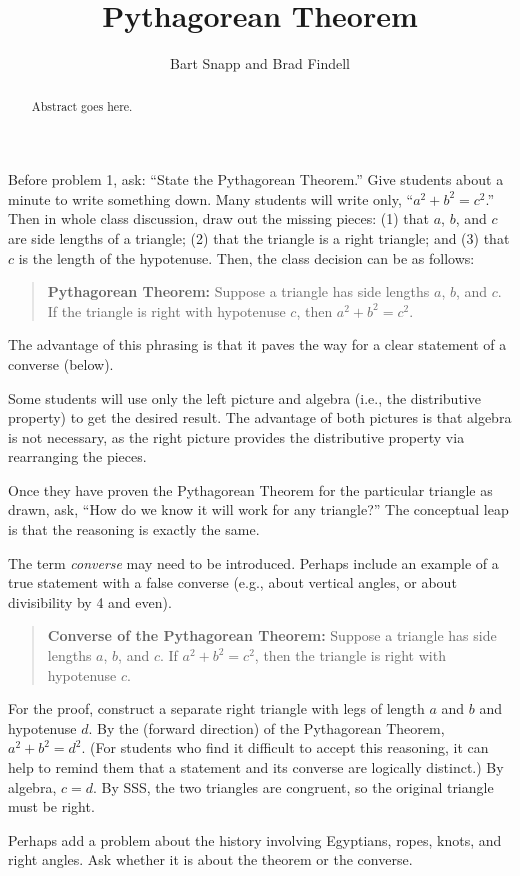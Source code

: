 \documentclass{ximera}
\title{Pythagorean Theorem}
\author{Bart Snapp and Brad Findell}
\begin{document}
\begin{abstract}
Abstract goes here.  
\end{abstract}
\maketitle

\begin{teachingnote}
Before problem 1, ask:  ``State the Pythagorean Theorem.''  Give students about a minute to write something down.  Many students will write only, ``$a^2 + b^2 = c^2$.''  Then in whole class discussion, draw out the missing pieces:  (1) that $a$, $b$, and $c$ are side lengths of a triangle;  (2) that the triangle is a right triangle; and (3) that $c$ is the length of the hypotenuse.  Then, the class decision can be as follows: 
 
\begin{quote}\textbf{Pythagorean Theorem:}  Suppose a triangle has side lengths $a$, $b$, and $c$.  If the triangle is right with hypotenuse $c$, then $a^2 + b^2 = c^2$. 
\end{quote}
The advantage of this phrasing is that it paves the way for a clear statement of a converse (below).   

Some students will use only the left picture and algebra (i.e., the distributive property) to get the desired result.  The advantage of both pictures is that algebra is not necessary, as the right picture provides the distributive property via rearranging the pieces.  

Once they have proven the Pythagorean Theorem for the particular triangle as drawn, ask, ``How do we know it will work for any triangle?''  The conceptual leap is that the reasoning is exactly the same.  

The term \emph{converse} may need to be introduced.  Perhaps include an example of a true statement with a false converse (e.g., about vertical angles, or about divisibility by 4 and even).  

\begin{quote}
\textbf{Converse of the Pythagorean Theorem:}  Suppose a triangle has side lengths $a$, $b$, and $c$.  If $a^2 + b^2 = c^2$, then the triangle is right with hypotenuse $c$. 
\end{quote}

For the proof, construct a separate right triangle with legs of length $a$ and $b$ and hypotenuse $d$.  By the (forward direction) of the Pythagorean Theorem, $a^2+b^2=d^2$.  (For students who find it difficult to accept this reasoning, it can help to remind them that a statement and its converse are logically distinct.)  By algebra, $c=d$.  By SSS, the two triangles are congruent, so the original triangle must be right.  

Perhaps add a problem about the history involving Egyptians, ropes, knots, and right angles.  Ask whether it is about the theorem or the converse. 
\end{teachingnote}
\end{document}
